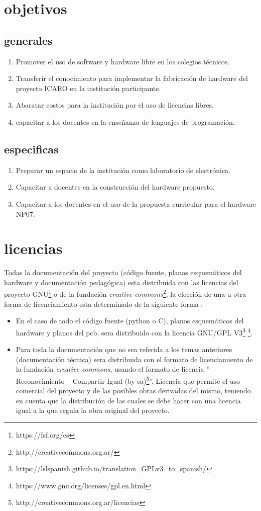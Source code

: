 \section{objetivos}
\subsection*{generales}
\begin{enumerate}
  \item Promover el uso de software y hardware libre en los colegios técnicos.
  \item Transferir el conocimiento para implementar la fabricación de hardware del proyecto ICARO en la institución participante.
  \item Abaratar costos para la institución por el uso de licencias libres.
  \item capacitar a los docentes en la enseñanza de lenguajes de programación.
\end{enumerate}
\subsection*{especificas}
\begin{enumerate}
  \item Preparar un espacio de la institución como laboratorio de electrónica.
  \item Capacitar a docentes en la construcción del hardware propuesto.
  \item Capacitar a los docentes en el uso de la propuesta curricular para el hardware NP07.
\end{enumerate}

\section{licencias}
Todas la documentación del proyecto (código fuente, planos esquemáticos del hardware y documentación pedagógica) esta distribuida con las licencias del proyecto GNU\footnote{https://fsf.org/es}  o de la fundación \textit{creative commons}\footnote{http://creativecommons.org.ar/}, la elección de una u otra forma de licenciamiento esta determinado de la siguiente forma \citep{bareno2011metodologia}:
\begin{itemize}
  \item En el caso de todo el  código fuente (python o C), planos esquemáticos del hardware y planos del pcb, sera distribuido con la licencia GNU/GPL V3\footnote{https://lslspanish.github.io/translation\_GPLv3\_to\_spanish/} \footnote{https://www.gnu.org/licenses/gpl.en.html}.
  \item Para toda la documentación que no sea referida a los temas anteriores (documentación técnica) sera distribuida con el formato de licenciamiento de la fundación \textit{creative commons}, usando el formato de licencia '' Reconocimiento – Compartir Igual (by-sa)\footnote{http://creativecommons.org.ar/licencias}''.  Licencia que permite el uso comercial del proyecto y de las posibles obras derivadas del mismo, teniendo en cuenta que la distribución de las cuales se debe hacer con una licencia igual a la que regula la obra original del proyecto.
\end{itemize}

